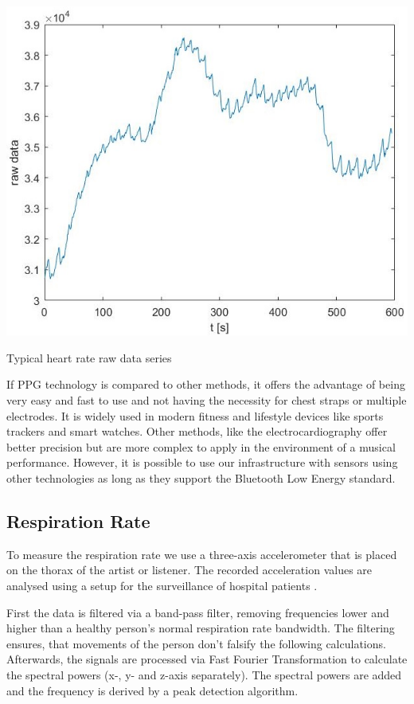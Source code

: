 \documentclass{sigchi-ext}
\begin{document}
\begin{marginfigure}[-30pc]
  \begin{minipage}{\marginparwidth}
    \centering
    \includegraphics[width=\marginparwidth]{figures/raw_data_heartrate}
    \caption{Typical heart rate raw data series}
    \label{fig:raw_data_HR}
  \end{minipage}
\end{marginfigure}

If PPG technology is compared to other methods, it offers the advantage of being very easy and fast
to use and not having the necessity for chest straps or multiple electrodes. It is widely used
in modern fitness and lifestyle devices like sports trackers and smart watches. Other methods,
like the electrocardiography offer better precision but are more complex to apply in the
environment of a musical performance. However, it is possible to use our infrastructure with sensors using other technologies
as long as they support the Bluetooth Low Energy standard.

\subsection{Respiration Rate}
To measure the respiration rate we use a three-axis accelerometer that is placed on the thorax of the artist or listener. The 
recorded acceleration values are analysed using a setup for the surveillance of hospital patients \cite{kurscheidt2016open}.

First the data is filtered via a band-pass filter, removing frequencies lower and higher than a healthy person's normal
respiration rate bandwidth. The filtering ensures, that movements of the person don't falsify the following calculations. 
Afterwards, the signals are processed via Fast Fourier Transformation to calculate the spectral powers
(x-, y- and z-axis separately). The spectral powers are added and the frequency is derived by a peak detection algorithm.
\end{document}

